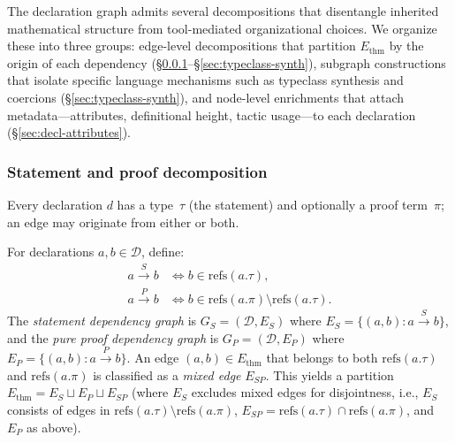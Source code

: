 The declaration graph admits several decompositions that disentangle inherited mathematical structure from tool-mediated organizational choices. We organize these into three groups: edge-level decompositions that partition $E_{\mathrm{thm}}$ by the origin of each dependency (\S\ref{sec:stmt-proof}--\S\ref{sec:typeclass-synth}), subgraph constructions that isolate specific language mechanisms such as typeclass synthesis and coercions (\S\ref{sec:typeclass-synth}), and node-level enrichments that attach metadata---attributes, definitional height, tactic usage---to each declaration (\S\ref{sec:decl-attributes}).

\subsubsection{Statement and proof decomposition}
\label{sec:stmt-proof}
Every declaration $d$ has a type~$\tau$ (the statement) and optionally a proof term~$\pi$; an edge may originate from either or both.

\begin{definition}\label{def:stmt-proof-dep}
For declarations $a, b \in \mathcal{D}$, define:
\begin{align*}
  a \xrightarrow{S} b &\iff b \in \mathrm{refs}(a.\tau), \\
  a \xrightarrow{P} b &\iff b \in \mathrm{refs}(a.\pi) \setminus \mathrm{refs}(a.\tau).
\end{align*}
The \emph{statement dependency graph} is $G_S = (\mathcal{D}, E_S)$ where $E_S = \{(a,b) : a \xrightarrow{S} b\}$, and the \emph{pure proof dependency graph} is $G_P = (\mathcal{D}, E_P)$ where $E_P = \{(a,b) : a \xrightarrow{P} b\}$. An edge $(a,b) \in E_{\mathrm{thm}}$ that belongs to both $\mathrm{refs}(a.\tau)$ and $\mathrm{refs}(a.\pi)$ is classified as a \emph{mixed edge} $E_{SP}$. This yields a partition $E_{\mathrm{thm}} = E_S \sqcup E_P \sqcup E_{SP}$ (where $E_S$ excludes mixed edges for disjointness, i.e., $E_S$ consists of edges in $\mathrm{refs}(a.\tau) \setminus \mathrm{refs}(a.\pi)$, $E_{SP} = \mathrm{refs}(a.\tau) \cap \mathrm{refs}(a.\pi)$, and $E_P$ as above).
\end{definition}

